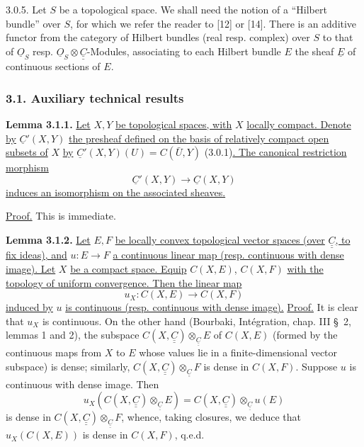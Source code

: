 3.0.5.
Let $S$ be a topological space. We shall need the notion of a \textquotedblleft Hilbert bundle\textquotedblright{} over $S$, for which we refer the reader to [12] or [14]. There is an additive functor from the category of Hilbert bundles (real resp. complex) over $S$ to that of $\underline{O}_S$ resp. $\underline{O}_S\otimes\underline{\underline{C}}$-Modules, associating to each Hilbert bundle $E$ the sheaf $\underline E$ of continuous sections of $E$.

\subsubsection*{3.1. Auxiliary technical results}
\textbf{Lemma 3.1.1.} \uline{Let} $X,Y$ \uline{be topological spaces, with} $X$ \uline{locally compact. Denote by} $\underline C'(X,Y)$ \uline{the presheaf defined on the basis of relatively compact open subsets of} $X$ \uline{by} $\underline C'(X,Y)(U)=C(\bar U,Y)$ (3.0.1)\uline{. The canonical restriction morphism}
\[
  \underline C'(X,Y)\longrightarrow \underline C(X,Y)
\]
\uline{induces an isomorphism on the associated sheaves.}

\uline{Proof.} This is immediate.

\textbf{Lemma 3.1.2.} \uline{Let} $E,F$ \uline{be locally convex topological vector spaces (over} $\underline{\underline{C}}$\uline{, to fix ideas), and} $u:E\to F$ \uline{a continuous linear map (resp. continuous with dense image). Let} $X$ \uline{be a compact space. Equip} $C(X,E)$, $C(X,F)$ \uline{with the topology of uniform convergence. Then the linear map}
\[
  u_X:C(X,E)\longrightarrow C(X,F)
\]
\uline{induced by} $u$ \uline{is continuous (resp. continuous with dense image).}
%
\uline{Proof.} It is clear that $u_X$ is continuous. On the other hand (Bourbaki, Intégration, chap. III \S~2, lemmas 1 and 2), the subspace $C(X,\underline{\underline{C}})\otimes_{\underline{\underline{C}}}E$ of $C(X,E)$ (formed by the continuous maps from $X$ to $E$ whose values lie in a finite-dimensional vector subspace) is dense; similarly, $C(X,\underline{\underline{C}})\otimes_{\underline{\underline{C}}}F$ is dense in $C(X,F)$. Suppose $u$ is continuous with dense image. Then
\[
  u_X(C(X,\underline{\underline{C}})\otimes_{\underline{\underline{C}}}E)=C(X,\underline{\underline{C}})\otimes_{\underline{\underline{C}}}u(E)
\]
is dense in $C(X,\underline{\underline{C}})\otimes_{\underline{\underline{C}}}F$, whence, taking closures, we deduce that $u_X(C(X,E))$ is dense in $C(X,F)$, q.e.d.

